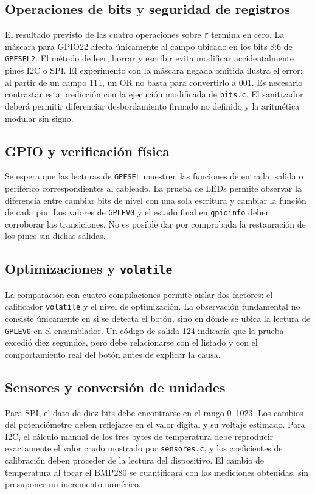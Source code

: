 \documentclass[conference]{IEEEtran}
\begin{document}
\subsection{Operaciones de bits y seguridad de registros}
El resultado previsto de las cuatro operaciones sobre \texttt{r} termina en cero. La máscara para GPIO22 afecta únicamente al campo ubicado en los bits 8:6 de \texttt{GPFSEL2}. El método de leer, borrar y escribir evita modificar accidentalmente pines I2C o SPI. El experimento con la máscara negada omitida ilustra el error: al partir de un campo 111, un OR no basta para convertirlo a 001. Es necesario contrastar esta predicción con la ejecución modificada de \texttt{bits.c}. El sanitizador deberá permitir diferenciar desbordamiento firmado no definido y la aritmética modular sin signo.

\subsection{GPIO y verificación física}
Se espera que las lecturas de \texttt{GPFSEL} muestren las funciones de entrada, salida o periférico correspondientes al cableado. La prueba de LEDs permite observar la diferencia entre cambiar bits de nivel con una sola escritura y cambiar la función de cada pin. Los valores de \texttt{GPLEV0} y el estado final en \texttt{gpioinfo} deben corroborar las transiciones. No es posible dar por comprobada la restauración de los pines sin dichas salidas.

\subsection{Optimizaciones y \texttt{volatile}}
La comparación con cuatro compilaciones permite aislar dos factores: el calificador \texttt{volatile} y el nivel de optimización. La observación fundamental no consiste únicamente en si se detecta el botón, sino en dónde se ubica la lectura de \texttt{GPLEV0} en el ensamblador. Un código de salida 124 indicaría que la prueba excedió diez segundos, pero debe relacionarse con el listado y con el comportamiento real del botón antes de explicar la causa.

\subsection{Sensores y conversión de unidades}
Para SPI, el dato de diez bits debe encontrarse en el rango 0--1023. Los cambios del potenciómetro deben reflejarse en el valor digital y su voltaje estimado. Para I2C, el cálculo manual de los tres bytes de temperatura debe reproducir exactamente el valor crudo mostrado por \texttt{sensores.c}, y los coeficientes de calibración deben proceder de la lectura del dispositivo. El cambio de temperatura al tocar el BMP280 se cuantificará con las mediciones obtenidas, sin presuponer un incremento numérico.
\end{document}
